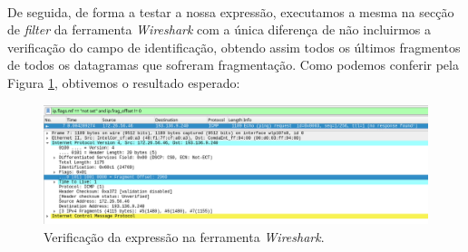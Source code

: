     \paragraph{}
    \begin{minipage}{\linewidth}
        \centering
    \end{minipage}
    
    \paragraph{}
    \par De seguida, de forma a testar a nossa expressão, executamos a mesma na secção de \textit{filter} da ferramenta \textit{Wireshark} com a única diferença de não incluirmos a verificação do campo de identificação, obtendo assim todos os últimos fragmentos de todos os datagramas que sofreram fragmentação. Como podemos conferir pela Figura \ref{questao3-ultima}, obtivemos o resultado esperado:
    
    \begin{figure}[H]
    \centering
    \includegraphics[width=490pt]{images/ParteI/Questao3/questao3-ultima.png}
    \caption{Verificação da expressão na ferramenta \textit{Wireshark}.}
    \label{questao3-ultima}
    \end{figure}